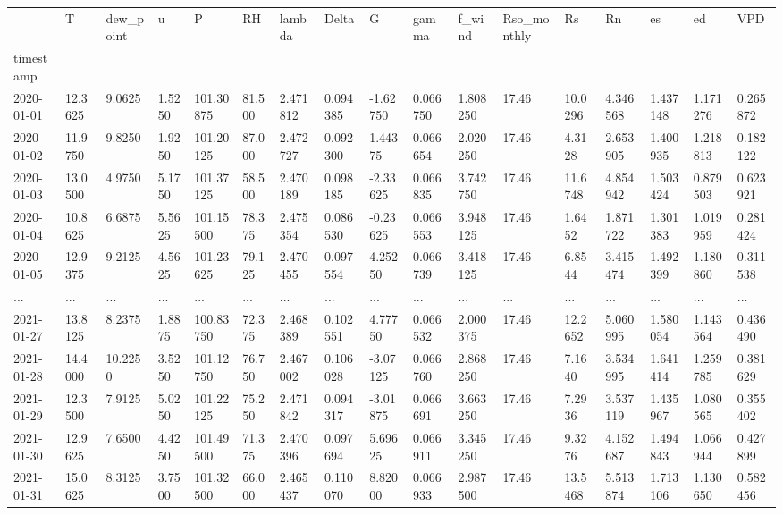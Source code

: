 \documentclass[
  letterpaper,
  DIV=11,
  numbers=noendperiod]{scrreprt}
\begin{document}
\begin{longtable}[]{@{}lllllllllllllllll@{}}
\toprule()
& T & dew\_point & u & P & RH & lambda & Delta & G & gamma & f\_wind &
Rso\_monthly & Rs & Rn & es & ed & VPD \\
timestamp & & & & & & & & & & & & & & & & \\
\midrule()
\endhead
2020-01-01 & 12.3625 & 9.0625 & 1.5250 & 101.30875 & 81.500 & 2.471812 &
0.094385 & -1.62750 & 0.066750 & 1.808250 & 17.46 & 10.0296 & 4.346568 &
1.437148 & 1.171276 & 0.265872 \\
2020-01-02 & 11.9750 & 9.8250 & 1.9250 & 101.20125 & 87.000 & 2.472727 &
0.092300 & 1.44375 & 0.066654 & 2.020250 & 17.46 & 4.3128 & 2.653905 &
1.400935 & 1.218813 & 0.182122 \\
2020-01-03 & 13.0500 & 4.9750 & 5.1750 & 101.37125 & 58.500 & 2.470189 &
0.098185 & -2.33625 & 0.066835 & 3.742750 & 17.46 & 11.6748 & 4.854942 &
1.503424 & 0.879503 & 0.623921 \\
2020-01-04 & 10.8625 & 6.6875 & 5.5625 & 101.15500 & 78.375 & 2.475354 &
0.086530 & -0.23625 & 0.066553 & 3.948125 & 17.46 & 1.6452 & 1.871722 &
1.301383 & 1.019959 & 0.281424 \\
2020-01-05 & 12.9375 & 9.2125 & 4.5625 & 101.23625 & 79.125 & 2.470455 &
0.097554 & 4.25250 & 0.066739 & 3.418125 & 17.46 & 6.8544 & 3.415474 &
1.492399 & 1.180860 & 0.311538 \\
... & ... & ... & ... & ... & ... & ... & ... & ... & ... & ... & ... &
... & ... & ... & ... & ... \\
2021-01-27 & 13.8125 & 8.2375 & 1.8875 & 100.83750 & 72.375 & 2.468389 &
0.102551 & 4.77750 & 0.066532 & 2.000375 & 17.46 & 12.2652 & 5.060995 &
1.580054 & 1.143564 & 0.436490 \\
2021-01-28 & 14.4000 & 10.2250 & 3.5250 & 101.12750 & 76.750 & 2.467002
& 0.106028 & -3.07125 & 0.066760 & 2.868250 & 17.46 & 7.1640 & 3.534995
& 1.641414 & 1.259785 & 0.381629 \\
2021-01-29 & 12.3500 & 7.9125 & 5.0250 & 101.22125 & 75.250 & 2.471842 &
0.094317 & -3.01875 & 0.066691 & 3.663250 & 17.46 & 7.2936 & 3.537119 &
1.435967 & 1.080565 & 0.355402 \\
2021-01-30 & 12.9625 & 7.6500 & 4.4250 & 101.49500 & 71.375 & 2.470396 &
0.097694 & 5.69625 & 0.066911 & 3.345250 & 17.46 & 9.3276 & 4.152687 &
1.494843 & 1.066944 & 0.427899 \\
2021-01-31 & 15.0625 & 8.3125 & 3.7500 & 101.32500 & 66.000 & 2.465437 &
0.110070 & 8.82000 & 0.066933 & 2.987500 & 17.46 & 13.5468 & 5.513874 &
1.713106 & 1.130650 & 0.582456 \\
\bottomrule()
\end{longtable}
\end{document}
